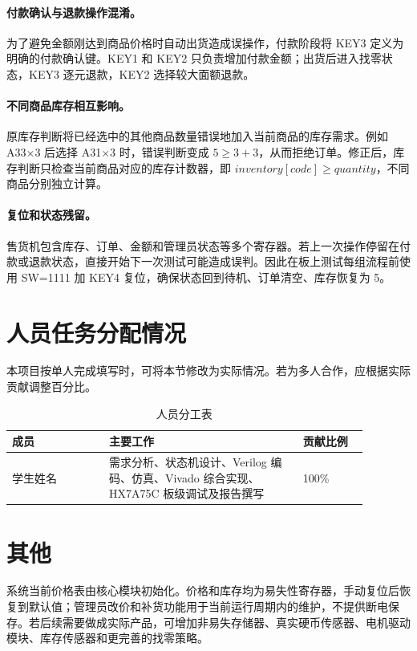 \documentclass[UTF8,a4paper,12pt]{ctexart}
\begin{document}
\paragraph{付款确认与退款操作混淆。}
为了避免金额刚达到商品价格时自动出货造成误操作，付款阶段将 KEY3 定义为明确的付款确认键。KEY1 和 KEY2 只负责增加付款金额；出货后进入找零状态，KEY3 逐元退款，KEY2 选择较大面额退款。

\paragraph{不同商品库存相互影响。}
原库存判断将已经选中的其他商品数量错误地加入当前商品的库存需求。例如 A33×3 后选择 A31×3 时，错误判断变成 $5\geq 3+3$，从而拒绝订单。修正后，库存判断只检查当前商品对应的库存计数器，即 $inventory[code]\geq quantity$，不同商品分别独立计算。

\paragraph{复位和状态残留。}
售货机包含库存、订单、金额和管理员状态等多个寄存器。若上一次操作停留在付款或退款状态，直接开始下一次测试可能造成误判。因此在板上测试每组流程前使用 SW=1111 加 KEY4 复位，确保状态回到待机、订单清空、库存恢复为 5。

\section{人员任务分配情况}

本项目按单人完成填写时，可将本节修改为实际情况。若为多人合作，应根据实际贡献调整百分比。

\begin{table}[H]
\centering
\caption{人员分工表}
\label{tab:members}
\begin{tabular}{p{0.24\linewidth}p{0.48\linewidth}p{0.16\linewidth}}
\toprule
成员 & 主要工作 & 贡献比例 \\
\midrule
学生姓名 & 需求分析、状态机设计、Verilog 编码、仿真、Vivado 综合实现、HX7A75C 板级调试及报告撰写 & 100\% \\
\bottomrule
\end{tabular}
\end{table}

\section{其他}

系统当前价格表由核心模块初始化。价格和库存均为易失性寄存器，手动复位后恢复到默认值；管理员改价和补货功能用于当前运行周期内的维护，不提供断电保存。若后续需要做成实际产品，可增加非易失存储器、真实硬币传感器、电机驱动模块、库存传感器和更完善的找零策略。
\end{document}
